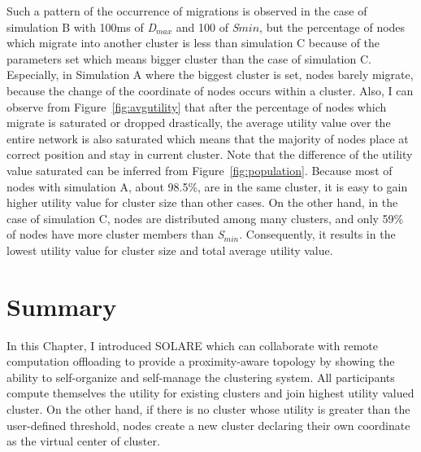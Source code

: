 %
Such a pattern of the occurrence of migrations is observed in the case
of simulation B with 100ms of \textit{D$_{max}$} and 100 of
\textit{S${min}$}, but the percentage of nodes which migrate into
another cluster is less than simulation C because of the parameters set
which means bigger cluster than the case of simulation C.
%
Especially, in Simulation A where the biggest cluster is set, nodes
barely migrate, because the change of the coordinate of nodes occurs
within a cluster.
%
Also, I can observe from Figure~\ref{fig:avgutility} that after the
percentage of nodes which migrate is saturated or dropped drastically,
the average utility value over the entire network is also saturated
which means that the majority of nodes place at correct position and
stay in current cluster.
%
Note that the difference of the utility value saturated can be inferred
from Figure~\ref{fig:population}.
%
Because most of nodes with simulation A, about 98.5\%, are in the same
cluster, it is easy to gain higher utility value for cluster size than
other cases.
%
On the other hand, in the case of simulation C, nodes are distributed
among many clusters, and only 59\% of nodes have more cluster members
than \textit{S$_{min}$}.
%
Consequently, it results in the lowest utility value for cluster size
and total average utility value.
%
%
%

\section{Summary}
\label{solare:summary}
In this Chapter, I introduced SOLARE which can collaborate with remote
computation offloading
to provide a proximity-aware
topology by showing the ability to self-organize and self-manage the
clustering system.
%
All participants compute themselves the utility for existing clusters
and join highest utility valued cluster.
%
On the other hand, if there is no cluster whose utility is greater than
the user-defined threshold, nodes create a new cluster declaring their
own coordinate as the virtual center of cluster.





